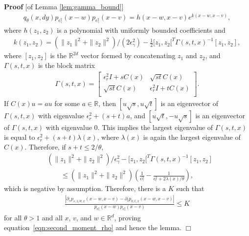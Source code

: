 \documentclass[12pt]{article}
\newenvironment {proof}{{\noindent\bf Proof }}{\hfill $\Box$ \medskip}
\newcommand{\IR}{\mathbb R}
\newcommand{\covq}{C}     %
\begin{document}
\begin{proof}[of Lemma \ref{lem:gamma_bound}]
\begin{align*}
{            q_\theta(x, dy)
        }{
            p_{\epsilon_\gamma^2}(x - w)
            p_{\epsilon_\gamma^2}(x - v)
        }
        =
        h(x-w, x-v) e^{ k(x-w, x-v) },
    \end{align*}
    where $h(z_1, z_2)$ is a polynomial with uniformly bounded coefficients and
    \begin{align*}
        k(z_1, z_2)
        =
        (\|z_1\|^2 + \|z_2\|^2)/(2 \epsilon_\gamma^2)
            - \frac{1}{2} [z_1, z_2[^T \Gamma(s, t, x)^{-1} [z_1, z_2] ,
    \end{align*}
    where $[z_1, z_2]$ is the $\IR^{2d}$ vector formed by concatenating $z_1$ and $z_2$,
    and $\Gamma(s, t, x)$ is the block matrix
    \begin{align*}
        \Gamma(s, t, x)
        =
        \left[
        \begin{array}{cc}
            \epsilon_r^2 I + s \covq(x) & \sqrt{st} \covq(x) \\
            \sqrt{st} \covq(x) & \epsilon_r^2 I + t \covq(x) \\
        \end{array}
        \right] .
    \end{align*}
    If $\covq(x) u = a u$ for some $a \in \IR$,
    then $[u \sqrt{s}, u \sqrt{t}]$ is an eigenvector of $\Gamma(s, t, x)$
    with eigenvalue $\epsilon^2_r + (s+t) a$,
    and $[u \sqrt{t}, - u \sqrt{s}]$ is an eigenvector of $\Gamma(s, t, x)$
    with eigenvalue 0.
    This implies the largest eigenvalue of $\Gamma(s, t, x)$
    is equal to $\epsilon^2_r + (s+t) \lambda(x)$,
    where $\lambda(x)$ is again the largest eigenvalue of $\covq(x)$.
    Therefore, if $s + t \le 2 / \theta$,
    \begin{align*}
        &
        (\|z_1\|^2 + \|z_2\|^2) / \epsilon^2_\gamma
            - [z_1, z_2[^T \Gamma(s, t, x)^{-1} [z_1, z_2]
        \\ &\qquad \le
        (\|z_1\|^2 + \|z_2\|^2) \left(
            \frac{1}{\epsilon^2_\gamma}
            - \frac{1}{\epsilon^2_r +  2\lambda(x)/\theta}
        \right) ,
    \end{align*}
    which is negative by assumption.
    Therefore, there is a $K$ such that
    \begin{align*}
        \frac{ \left|
            \partial_s p_{s, 1/\theta, x}(x-w, x-v)
            - \partial_t p_{0, t, x}(x-w, x-v)
        \right| }{
            p_{\epsilon^2_\gamma}(x - w)
            p_{\epsilon^2_\gamma}(x - v)
        }
        \le K
    \end{align*}
    for all $\theta > 1$ and all $x$, $v$, and $w \in \IR^d$,
    proving equation~\eqref{eqn:second_moment_rho} and hence the lemma.
\end{proof}
\end{document}
